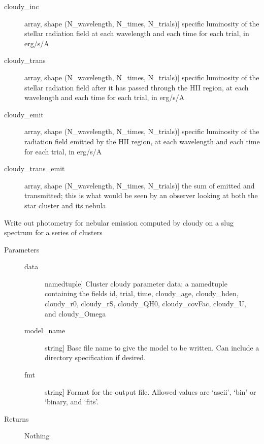 \documentclass[letterpaper,10pt,english]{sphinxmanual}
\begin{document}
\begin{fulllineitems}
\begin{description}
\begin{description}
\item[{cloudy\_inc}] \leavevmode{[}array, shape (N\_wavelength, N\_times, N\_trials){]}
specific luminosity of the stellar radiation field at each
wavelength and each time for each trial, in erg/s/A

\item[{cloudy\_trans}] \leavevmode{[}array, shape (N\_wavelength, N\_times, N\_trials){]}
specific luminosity of the stellar radiation field after it has
passed through the HII region, at each wavelength and each time
for each trial, in erg/s/A

\item[{cloudy\_emit}] \leavevmode{[}array, shape (N\_wavelength, N\_times, N\_trials){]}
specific luminosity of the radiation field emitted by the HII
region, at each wavelength and each time for each trial, in
erg/s/A

\item[{cloudy\_trans\_emit}] \leavevmode{[}array, shape (N\_wavelength, N\_times, N\_trials){]}
the sum of emitted and transmitted; this is what would be seen
by an observer looking at both the star cluster and its nebula

\end{description}

\end{description}

\end{fulllineitems}


\begin{fulllineitems}
\label{cloudy:slugpy.cloudy.write_cluster_cloudyparams}
Write out photometry for nebular emission computed by cloudy on a
slug spectrum for a series of clusters
\begin{description}
\item[{Parameters}] \leavevmode\begin{description}
\item[{data}] \leavevmode{[}namedtuple{]}
Cluster cloudy parameter data; a namedtuple containing the
fields id, trial, time, cloudy\_age, cloudy\_hden, cloudy\_r0, 
cloudy\_rS, cloudy\_QH0, cloudy\_covFac, cloudy\_U, and cloudy\_Omega

\item[{model\_name}] \leavevmode{[}string{]}
Base file name to give the model to be written. Can include a
directory specification if desired.

\item[{fmt}] \leavevmode{[}string{]}
Format for the output file. Allowed values are `ascii', `bin'
or `binary, and `fits'.

\end{description}

\item[{Returns}] \leavevmode
Nothing

\end{description}

\end{fulllineitems}
\end{document}
